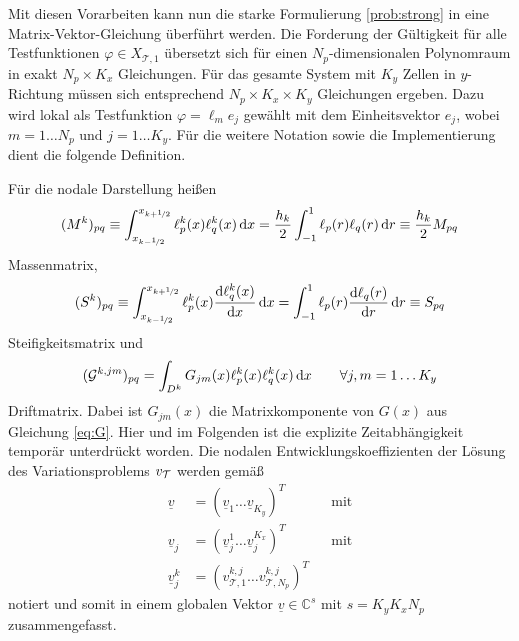 Mit diesen Vorarbeiten kann nun die starke Formulierung \ref{prob:strong} in eine Matrix-Vektor-Gleichung überführt werden. Die Forderung der Gültigkeit für alle Testfunktionen $\varphi\in X_{\mathcal{T},1}$ übersetzt sich für einen $N_p$-dimensionalen Polynomraum in exakt $N_p \times K_x$ Gleichungen. Für das gesamte System mit $K_y$ Zellen in $y$-Richtung müssen sich entsprechend $N_p \times K_x \times K_y$ Gleichungen ergeben. Dazu wird lokal als Testfunktion $\varphi = \ell_m e_j$ gewählt mit dem Einheitsvektor $e_j$, wobei $m=1\dots N_p$ und $j=1\dots K_y$. Für die weitere Notation sowie die Implementierung dient die folgende Definition.
\begin{definition} \label{def:matrizen}
  Für die nodale Darstellung heißen
  \begin{equation*}
    (M^k)_{pq} \equiv \int_{x_{k-\nicefrac{1}{2}}}^{x_{k+\nicefrac{1}{2}}} \ell_p^k(x) \ell_q^k(x) \mathop{}\!\mathrm{d} x = \frac{h_k}{2}\int_{-1}^1 \ell_p(r) \ell_q(r) \mathop{}\!\mathrm{d} r \equiv \frac{h_k}{2} M_{pq}
    \label{eq:Mmatrix}
  \end{equation*}
  Massenmatrix,
  \begin{equation*}
    (S^k)_{pq} \equiv \int_{x_{k-\nicefrac{1}{2}}}^{x_{k+\nicefrac{1}{2}}} \ell_p^k(x) \frac{\mathrm{d}\ell_q^k(x)}{\mathrm{d}x} \mathop{}\!\mathrm{d} x = \int_{-1}^1 \ell_p(r) \frac{\mathrm{d}\ell_q(r)}{\mathrm{d}r}  \mathop{}\!\mathrm{d} r \equiv S_{pq}
    \label{eq:Smatrix}
  \end{equation*}
  Steifigkeitsmatrix und
  \begin{equation*}
    (\drift^{k,jm})_{pq} = \int_{D^k} G_{jm}(x) \ell_p^k(x) \ell_q^k(x) \diff x \qquad \forall j,m=1\dots K_y %
  \end{equation*}
  Driftmatrix. Dabei ist $G_{jm}(x)$ die Matrixkomponente von $G(x)$ aus Gleichung \eqref{eq:G}. Hier und im Folgenden ist die explizite Zeitabhängigkeit temporär unterdrückt worden. Die nodalen Entwicklungskoeffizienten der Lösung des Variationsproblems $v_{\mathcal{T}}$ werden gemäß
  \begin{equation*}
    \begin{aligned}
      \underline{v} &= (\underline{v}_1 \dots \underline{v}_{K_y})^T        &  &\text{mit} \\
      \underline{v}_j &= (\underline{v}_j^1 \dots \underline{v}_j^{K_x})^T  &  &\text{mit} \\
      \underline{v}_j^k &= (v_{\mathcal{T},1}^{k,j} \dots v_{\mathcal{T},N_p}^{k,j})^T
    \end{aligned}
  \end{equation*}
  notiert und somit in einem globalen Vektor $\underline{v} \in \mathbb{C}^{s}$ mit $s=K_y K_x N_p$ zusammengefasst.
\end{definition}
